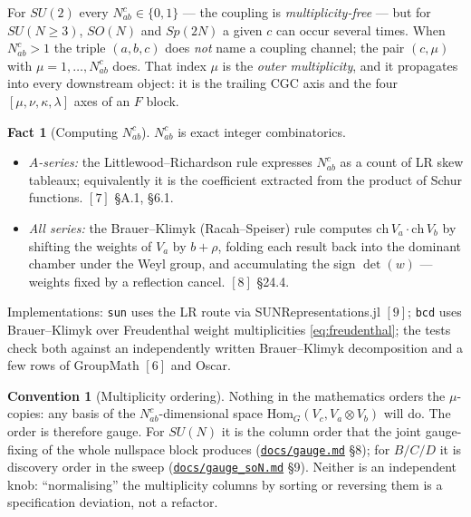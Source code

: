 \documentclass[11pt,a4paper]{article}
\theoremstyle{plain}
\theoremstyle{definition}
\newtheorem{fact}[theorem]{Fact}
\newtheorem{convention}[theorem]{Convention}
\newcommand{\Hom}{\mathrm{Hom}}
\newcommand{\code}[1]{\texttt{#1}}
\newcommand{\gaugemd}{\href{https://github.com/Ryo-wtnb11/fusion-symbols/blob/main/docs/gauge.md}{\code{docs/gauge.md}}}
\newcommand{\gaugeson}{\href{https://github.com/Ryo-wtnb11/fusion-symbols/blob/main/docs/gauge_soN.md}{\code{docs/gauge\_soN.md}}}
\begin{document}
For $SU(2)$ every $N^c_{ab}\in\{0,1\}$ --- the coupling is
\emph{multiplicity-free} --- but for $SU(N\ge 3)$, $SO(N)$ and $Sp(2N)$ a given
$c$ can occur several times. When $N^c_{ab}>1$ the triple $(a,b,c)$ does
\emph{not} name a coupling channel; the pair $(c,\mu)$ with
$\mu=1,\dots,N^c_{ab}$ does. That index $\mu$ is the \emph{outer multiplicity},
and it propagates into every downstream object: it is the trailing CGC axis and
the four $[\mu,\nu,\kappa,\lambda]$ axes of an $F$ block.

\begin{fact}[Computing $N^c_{ab}$]\label{fact:nab}
$N^c_{ab}$ is exact integer combinatorics.
\begin{itemize}[leftmargin=1.4em]
  \item \emph{$A$-series:} the Littlewood--Richardson rule expresses
    $N^c_{ab}$ as a count of LR skew tableaux; equivalently it is the
    coefficient extracted from the product of Schur functions. $[7]$ \S A.1,
    \S6.1.
  \item \emph{All series:} the Brauer--Klimyk (Racah--Speiser) rule computes
    $\mathrm{ch}\,V_a\cdot\mathrm{ch}\,V_b$ by shifting the weights of $V_a$ by
    $b+\rho$, folding each result back into the dominant chamber under the
    Weyl group, and accumulating the sign $\det(w)$ --- weights fixed by a
    reflection cancel. $[8]$ \S24.4.
\end{itemize}
\end{fact}

Implementations: \code{sun} uses the LR route via
SUNRepresentations.jl $[9]$; \code{bcd} uses Brauer--Klimyk over
Freudenthal weight multiplicities \eqref{eq:freudenthal}; the tests check
both against an independently written Brauer--Klimyk decomposition and a few
rows of GroupMath $[6]$ and Oscar.

\begin{convention}[Multiplicity ordering]
Nothing in the mathematics orders the $\mu$-copies: any basis of the
$N^c_{ab}$-dimensional space $\Hom_G(V_c,V_a\otimes V_b)$ will do. The order is
therefore gauge. For $SU(N)$ it is the column order that the joint
gauge-fixing of the whole nullspace block produces (\gaugemd{} \S8); for
$B/C/D$ it is discovery order in the sweep (\gaugeson{} \S9). Neither is an
independent knob: ``normalising'' the multiplicity columns by sorting or
reversing them is a specification deviation, not a refactor.
\end{convention}

\end{document}
